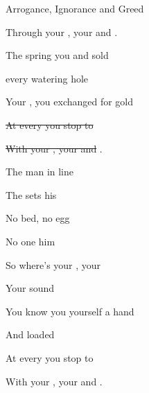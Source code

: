 \begin{SBSong}{Arrogance, Ignorance and Greed}
\begin{SBChorus}
    Through your , your  and . 
  \end{SBChorus}
  \CBPageBrk
  \begin{SBVerse}
    The  spring you  and sold

     every watering hole

    Your , you exchanged for gold

    \sout{ At every  you stop to }

    \sout{With your , your  and }.
  \end{SBVerse}
  \begin{SBVerse}
    The  man  in line

    The  sets his 

    No  bed, no  egg

    No one  him 

    So where's your , your 

    Your  sound 

    You know you  yourself a  hand

    And loaded   
  \end{SBVerse}
  \begin{SBChorus}
     At every  you stop to 

    With your , your  and . 
  \end{SBChorus}
\end{SBSong}
